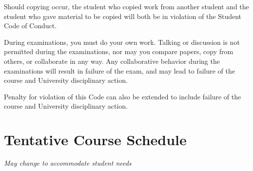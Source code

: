 \documentclass[a4paper]{article}
\begin{document}
Should copying occur, the student who copied work from another student and the student who gave material to be copied will both be in violation of the Student Code of Conduct. 

During examinations, you must do your own work. Talking or discussion is not permitted during the examinations, nor may you compare papers, copy from others, or collaborate in any way. Any collaborative behavior during the examinations will result in failure of the exam, and may lead to failure of the course and University disciplinary action.

Penalty for violation of this Code can also be extended to include failure of the course and University disciplinary action. 

\newpage
\section{Tentative Course Schedule }

{\it May change to accommodate student needs}
\end{document}
